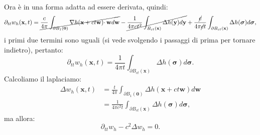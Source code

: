 \documentclass[10pt,a4paper,twoside,openright]{book}
\newcommand{\x}{\mathbf{x}}
\newcommand{\y}{\mathbf{y}}
\begin{document}
\begin{dimostrazione}
\begin{align*}
	\end{align*}
	Ora è in una forma adatta ad essere derivata, quindi:
	\begin{equation*}
		\partial _{tt} w_{h}(\x ,t) =\cancel{\frac{c}{4\pi }\int _{\partial B_{1}(\mathbf{0})} \nabla h(\x +ct\mathbf{w}) \cdotp \mathbf{w} d\mathbf{w}} -\cancel{\frac{1}{4\pi ct^{2}}\int _{B_{ct}(\x)} \Delta h(\y) d\y} +\frac{\cancel{c}}{4\pi \cancel{c} t}\int _{\partial B_{ct}(\x)} \Delta h(\bm{\sigma }) d\bm{\sigma } ,
	\end{equation*}
	i primi due termini sono uguali (si vede svolgendo i passaggi di prima per tornare indietro), pertanto:
	\begin{equation*}
		\partial _{tt} w_{h}(\x ,t) =\frac{1}{4\pi t}\int _{\partial B_{ct}(\x)} \Delta h(\bm{\sigma }) d\bm{\sigma } .
	\end{equation*}
	Calcoliamo il laplaciamo:
	\begin{align*}
		\Delta w_{h}(\x ,t) & =\frac{t}{4\pi }\int _{\partial B_{1}(\mathbf{0})} \Delta h(\x +ct\mathbf{w}) d\mathbf{w} \\
		                            & =\frac{1}{4\pi c^{2} t}\int _{\partial B_{ct}(\x)} \Delta h(\bm{\sigma }) d\bm{\sigma } , 
	\end{align*}
	ma allora:
	\begin{equation*}
		\partial _{tt} w_{h} -c^{2} \Delta w_{h} =0.
	\end{equation*}
\end{dimostrazione}
\end{document}
